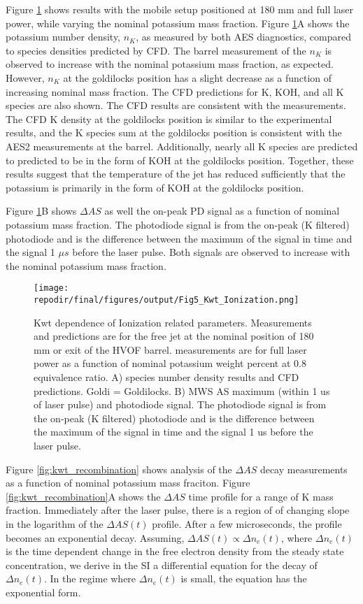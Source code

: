 Figure \ref{fig:kwt_ionization} shows results with the mobile setup positioned at 180 mm and full laser power, while varying the nominal potassium mass fraction. Figure \ref{fig:kwt_ionization}A shows the potassium number density, $n_K$, as measured by both AES diagnostics, compared to species densities predicted by CFD. The barrel measurement of the $n_K$ is observed to increase with the nominal potassium mass fraction, as expected. However, $n_K$ at the goldilocks position has a slight decrease as a function of increasing nominal mass fraction. The CFD predictions for K, KOH, and all K species are also shown. The CFD results are consistent with the measurements. The CFD K density at the goldilocks position is similar to the experimental results, and the K species sum at the goldilocks position is consistent with the AES2 measurements at the barrel. Additionally, nearly all K species are predicted to predicted to be in the form of KOH at the goldilocks position. Together, these results suggest that the temperature of the jet has reduced sufficiently that the potassium is primarily in the form of KOH at the goldilocks position.

Figure  \ref{fig:kwt_ionization}B shows $\Delta AS$ as well the on-peak PD signal as a function of nominal potassium mass fraction. The photodiode signal is from the on-peak (K filtered) photodiode and is the difference between the maximum of the signal in time and the signal 1 $\mu s$ before the laser pulse. Both signals are observed to increase with the nominal potassium mass fraction. 

\begin{figure}[h]
    \texttt{[image: \\repodir/final/figures/output/Fig5\_Kwt\_Ionization.png]} 
    \caption{Kwt dependence of Ionization related parameters. Measurements and predictions are for the free jet at the nominal position of 180 mm or exit of the HVOF barrel. measurements are for full laser power as a function of nominal potassium weight percent at 0.8 equivalence ratio. A) species number density results and CFD predictions. Goldi = Goldilocks. B) MWS AS maximum (within 1 us of laser pulse) and photodiode signal. The photodiode signal is from the on-peak (K filtered) photodiode and is the difference between the maximum of the signal in time and the signal 1 us before the laser pulse.  }
    \label{fig:kwt_ionization}
\end{figure}


Figure \ref{fig:kwt_recombination} shows analysis of the $\Delta AS$ decay measurements as a function of nominal potassium mass fraciton.  Figure \ref{fig:kwt_recombination}A shows the $\Delta AS$ time profile for a range of K mass fraction. Immediately after the laser pulse, there is a region of of changing slope in the logarithm of the $\Delta AS (t)$ profile. After a few microseconds, the profile becomes an exponential decay. Assuming, $\Delta AS (t) \propto \Delta n_e (t)$, where $\Delta n_e (t)$ is the time dependent change in the free electron density from the steady state concentration, we derive in the SI a differential equation for the decay of $\Delta n_e (t)$. In the regime where $\Delta n_e (t)$ is small, the equation has the exponential form.  

